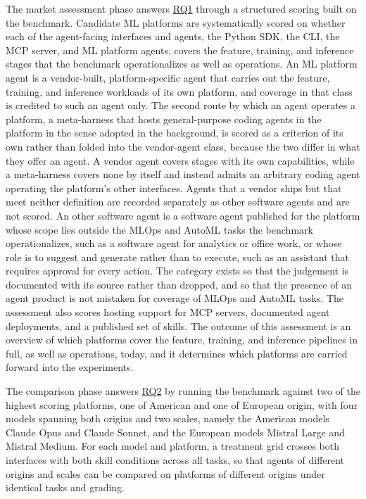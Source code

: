 \documentclass[
english,                 %
bibtex,                  %
]{kththesis}
\numberwithin{listing}{chapter}
\begin{document}
The market assessment phase answers \hyperref[rq1]{RQ1} through a structured scoring built on the benchmark. Candidate \gls{ML} platforms are systematically scored on whether each of the agent-facing interfaces and agents, the Python \gls{SDK}, the \gls{CLI}, the \gls{MCP} server, and \gls{ML} platform agents, covers the feature, training, and inference stages that the benchmark operationalizes as well as operations. An \gls{ML} platform agent is a vendor-built, platform-specific agent that carries out the feature, training, and inference workloads of its own platform, and coverage in that class is credited to such an agent only. The second route by which an agent operates a platform, a meta-harness that hosts general-purpose coding agents in the platform in the sense adopted in the background, is scored as a criterion of its own rather than folded into the vendor-agent class, because the two differ in what they offer an agent. A vendor agent covers stages with its own capabilities, while a meta-harness covers none by itself and instead admits an arbitrary coding agent operating the platform's other interfaces. Agents that a vendor ships but that meet neither definition are recorded separately as other software agents and are not scored. An other software agent is a software agent published for the platform whose scope lies outside the \gls{MLOps} and \gls{AutoML} tasks the benchmark operationalizes, such as a software agent for analytics or office work, or whose role is to suggest and generate rather than to execute, such as an assistant that requires approval for every action. The category exists so that the judgement is documented with its source rather than dropped, and so that the presence of an agent product is not mistaken for coverage of \gls{MLOps} and \gls{AutoML} tasks. The assessment also scores hosting support for \gls{MCP} servers, documented agent deployments, and a published set of skills. The outcome of this assessment is an overview of which platforms cover the feature, training, and inference pipelines in full, as well as operations, today, and it determines which platforms are carried forward into the experiments.

The comparison phase answers \hyperref[rq2]{RQ2} by running the benchmark against two of the highest scoring platforms, one of American and one of European origin, with four models spanning both origins and two scales, namely the American models Claude Opus and Claude Sonnet, and the European models Mistral Large and Mistral Medium. For each model and platform, a treatment grid crosses both interfaces with both skill conditions across all tasks, so that agents of different origins and scales can be compared on platforms of different origins under identical tasks and grading.
\end{document}
